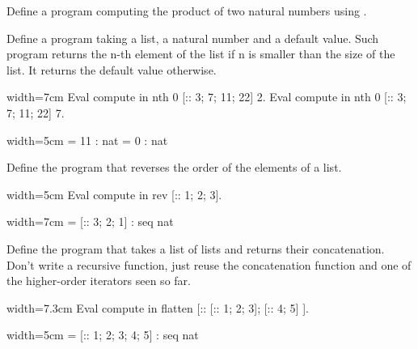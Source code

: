 \begin{Exercise}[label=ex:itermul,difficulty=0,title={Multiplication with iteration}]
Define a program computing the product of two natural numbers
using .
\end{Exercise}

\begin{Exercise}[label=ex:nth,difficulty=0,title={Find the n-th element}]
Define a program taking a list, a natural number and a default value.  Such
program returns the n-th element of the list if n is smaller than the size of
the list.  It returns the default value otherwise.

\begin{coq}{}{width=7cm}
Eval compute in
  nth 0 [:: 3; 7; 11; 22] 2.
Eval compute in
  nth 0 [:: 3; 7; 11; 22] 7.
\end{coq}
\begin{coqout}{}{width=5cm}
     = 11
     : nat
     = 0
     : nat
\end{coqout}
\end{Exercise}

\begin{Exercise}[label=ex:rev,difficulty=0,title={List reversal}]
Define the program  that reverses the order of the elements
of a list. 

\begin{coq}{}{width=5cm}
Eval compute in
  rev [:: 1; 2; 3].
\end{coq}
\begin{coqout}{}{width=7cm}
 = [:: 3; 2; 1]
 : seq nat
\end{coqout}
\end{Exercise}

\begin{Exercise}[label=ex:flatten,difficulty=1,title={List flattening}]
Define the program  that takes a list of lists and returns
their concatenation.  Don't write a recursive function, just reuse
the concatenation function and one of the higher-order iterators
seen so far.

\begin{coq}{}{width=7.3cm}
Eval compute in
  flatten [:: [:: 1; 2; 3]; [:: 4; 5] ].
\end{coq}
\begin{coqout}{}{width=5cm}
 = [:: 1; 2; 3; 4; 5]
 : seq nat
\end{coqout}
\end{Exercise}


